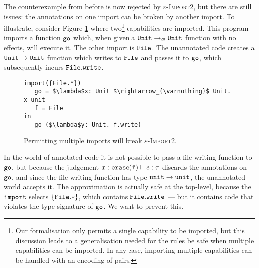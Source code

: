 The counterexample from before is now rejected by \textsc{$\varepsilon$-Import2}, but there are still issues: the annotations on one import can be broken by another import. To illustrate, consider Figure \ref{fig:rule_import2_counterexample} where two\footnote{Our formalisation only permits a single capability to be imported, but this discussion leads to a generalisation needed for the rules be safe when multiple capabilities can be imported.  In any case, importing multiple capabilities can be handled with an encoding of pairs.} capabilities are imported. This program imports a function $\mathtt{go}$ which, when given a $\mathtt{Unit} \rightarrow_{\varnothing} \mathtt{Unit}$ function with no effects, will execute it. The other import is $\mathtt{File}$. The unannotated code creates a $\mathtt{Unit} \rightarrow \mathtt{Unit}$ function which writes to $\mathtt{File}$ and passes it to $\mathtt{go}$, which subsequently incurs $\mathtt{File.write}$.

\begin{figure}[h]

\begin{lstlisting}
import({File.*})
   go = $\lambda$x: Unit $\rightarrow_{\varnothing}$ Unit. x unit
   f = File
in
   go ($\lambda$y: Unit. f.write)

\end{lstlisting}

\vspace{-7pt}
\caption{Permitting multiple imports will break \textsc{$\varepsilon$-Import2}.}
\label{fig:rule_import2_counterexample}
\end{figure}

In the world of annotated code it is not possible to pass a file-writing function to $\mathtt{go}$, but because the judgement $x: \mathtt{erase}(\hat \tau) \vdash e: \tau$ discards the annotations on $\mathtt{go}$, and since the file-writing function has type $\mathtt{unit} \rightarrow \mathtt{unit}$, the unannotated world accepts it. The approximation is actually safe at the top-level, because the $\mathtt{import}$ selects $\{ \mathtt{File.*} \}$, which contains $\mathtt{File.write}$ --- but it contains code that violates the type signature of $\mathtt{go}$. We want to prevent this.

